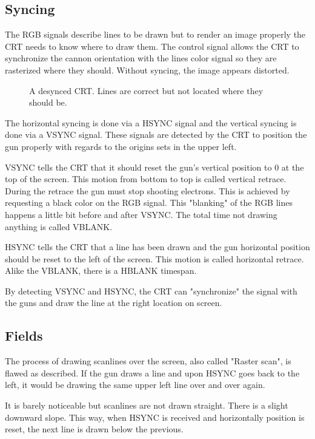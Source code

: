 \subsection{Syncing}
The RGB signals describe lines to be drawn but to render an image properly the CRT needs to know where to draw them. The control signal allows the CRT to synchronize the cannon orientation with the lines color signal so they are rasterized where they should. Without syncing, the image appears distorted. 

\begin{figure}[H]
\caption*{A desynced CRT. Lines are correct but not located where they should be.}
\end{figure}





The horizontal syncing is done via a HSYNC signal and the vertical syncing is done via a VSYNC signal. These signals are detected by the CRT to position the gun properly with regards to the origins sets in the upper left.

VSYNC tells the CRT that it should reset the gun's vertical position to 0 at the top of the screen. This motion from bottom to top is called vertical retrace. During the retrace the gun must stop shooting electrons. This is achieved by requesting a black color on the RGB signal. This "blanking" of the RGB lines happens a little bit before and after VSYNC. The total time not drawing anything is called VBLANK.

HSYNC tells the CRT that a line has been drawn and the gun horizontal position should be reset to the left of the screen. This motion is called horizontal retrace. Alike the VBLANK, there is a HBLANK timespan.

By detecting VSYNC and HSYNC, the CRT can "synchronize" the signal with the guns and draw the line at the right location on screen.



\pagebreak
\subsection{Fields}

The process of drawing scanlines over the screen, also called "Raster scan", is flawed as described. If the gun draws a line and upon HSYNC goes back to the left, it would be drawing the same upper left line over and over again. 

It is barely noticeable but scanlines are not drawn straight. There is a slight downward slope. This way, when HSYNC is received and horizontally position is reset, the next line is drawn below the previous.



